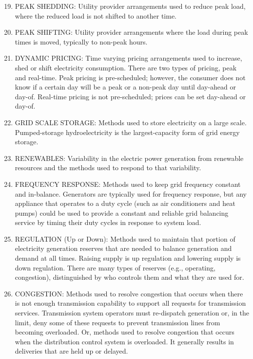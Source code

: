 \begin{enumerate}
\setcounter{enumi}{18}
\item
PEAK SHEDDING: Utility provider arrangements used to reduce peak load, where the reduced 
load is not shifted to another time.

\item
PEAK SHIFTING: Utility provider arrangements where the load during peak times is moved, 
typically to non-peak hours.

\item
DYNAMIC PRICING: Time varying pricing arrangements used to increase, shed or shift 
electricity consumption. There are two types of pricing, peak and real-time. 
Peak pricing is pre-scheduled; however, the consumer does not know if a certain day will be 
a peak or a non-peak day until day-ahead or day-of. Real-time pricing is not pre-scheduled; 
prices can be set day-ahead or day-of.

\item
GRID SCALE STORAGE: Methods used to store electricity on a large scale. Pumped-storage 
hydroelectricity is the largest-capacity form of grid energy storage.

\item
RENEWABLES: Variability in the electric power generation from renewable resources and 
the methods used to respond to that variability.

\item
FREQUENCY RESPONSE: Methods used to keep grid frequency constant and in-balance. 
Generators are typically used for frequency response, but any appliance that operates to 
a duty cycle (such as air conditioners and heat pumps) could be used to provide a constant 
and reliable grid balancing service by timing their duty cycles in response to system load. 

\item
REGULATION (Up or Down): Methods used to maintain that portion of electricity generation 
reserves that are needed to balance generation and demand at all times. Raising supply is 
up regulation and lowering supply is down regulation. There are many types of 
reserves (e.g., operating, congestion), distinguished by who controls them and what they are used for.

\item
CONGESTION: Methods used to resolve congestion that occurs when there is not enough 
transmission capability to support all requests for transmission services. Transmission 
system operators must re-dispatch generation or, in the limit, deny some of these 
requests to prevent transmission lines from becoming overloaded. Or, methods used to resolve 
congestion that occurs when the distribution control system is overloaded. It generally 
results in deliveries that are held up or delayed. 


\end{enumerate}
